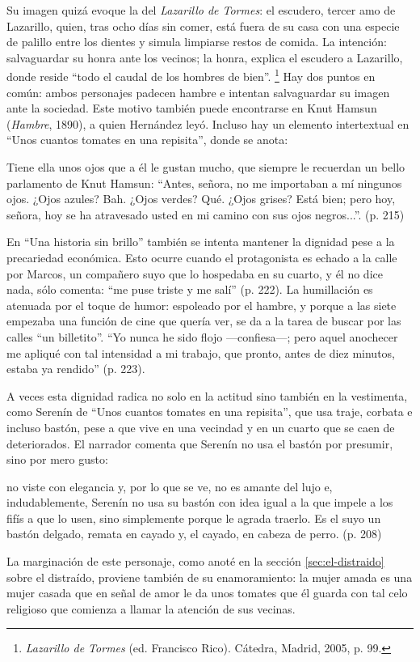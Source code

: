 \documentclass[14pt,twoside,final]{extbook} %
\let\oldfootnote\footnote
\renewcommand\footnote[1]{%
\oldfootnote{\hspace{1mm}#1}}
\begin{document}
Su imagen quizá evoque la del \emph{Lazarillo de Tormes}: el escudero, tercer amo de Lazarillo, quien, tras ocho días sin comer, está fuera de su casa con una especie de palillo entre los dientes y simula limpiarse restos de comida. La intención: salvaguardar su honra ante los vecinos; la honra, explica el escudero a Lazarillo, donde reside ``todo el caudal de los hombres de bien''.\footnote{\emph{Lazarillo de Tormes} (ed. Francisco Rico). Cátedra, Madrid, 2005, p. 99.} Hay dos puntos en común: ambos personajes padecen hambre e intentan salvaguardar su imagen ante la sociedad. Este motivo también puede encontrarse en Knut Hamsun (\emph{Hambre}, 1890), a quien Hernández leyó. Incluso hay un elemento intertextual en ``Unos cuantos tomates en una repisita'', donde se anota: 
\begin{quoting}
Tiene ella unos ojos que a él le gustan mucho, que siempre le recuerdan un bello parlamento de Knut Hamsun: ``Antes, señora, no me importaban a mí ningunos ojos. ¿Ojos azules? Bah. ¿Ojos verdes? Qué. ¿Ojos grises? Está bien; pero hoy, señora, hoy se ha atravesado usted en mi camino con sus ojos negros...''. (p. 215)
\end{quoting}
En ``Una historia sin brillo'' también se intenta mantener la dignidad pese a la precariedad económica. Esto ocurre cuando el protagonista es echado a la calle por Marcos, un compañero suyo que lo hospedaba en su cuarto, y él no dice nada, sólo comenta: ``me puse triste y me salí'' (p. 222). La humillación es atenuada por el toque de humor: espoleado por el hambre, y porque a las siete empezaba una función de cine que quería ver, se da a la tarea de buscar por las calles ``un billetito''. ``Yo nunca he sido flojo ---confiesa---; pero aquel anochecer me apliqué con tal intensidad a mi trabajo, que pronto, antes de diez minutos, estaba ya rendido'' (p. 223).

A veces esta dignidad radica no solo en la actitud sino también en la vestimenta, como Serenín de ``Unos cuantos tomates en una repisita'', que usa traje, corbata e incluso bastón, pese a que vive en una vecindad y en un cuarto que se caen de deteriorados. El narrador comenta que Serenín no usa el bastón por presumir, sino por mero gusto:
\begin{quoting}
no viste con elegancia y, por lo que se ve, no es amante del lujo e, indudablemente, Serenín no usa su bastón con idea igual a la que impele a los fifís a que lo usen, sino simplemente porque le agrada traerlo. Es el suyo un bastón delgado, remata en cayado y, el cayado, en cabeza de perro. (p. 208)
\end{quoting}
La marginación de este personaje, como anoté en la sección \ref{sec:el-distraido} sobre el distraído, proviene también de su enamoramiento: la mujer amada es una mujer casada que en señal de amor le da unos tomates que él guarda con tal celo religioso que comienza a llamar la atención de sus vecinas.
\end{document}
